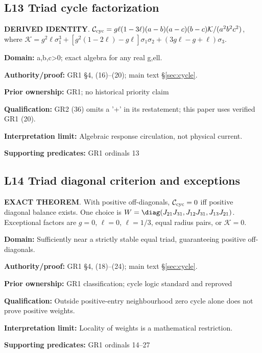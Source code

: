 \par\noindent\begin{minipage}{\linewidth}
\subsection*{L13 Triad cycle factorization}
\textbf{DERIVED IDENTITY}. \(\mathcal C_{\rm cyc}=g\ell(1-3\ell)(a-b)(a-c)(b-c)\mathcal K/(a^2b^2c^2)\), where \(\mathcal K=g^2\ell\sigma_1^3+[g^2(1-2\ell)-g\ell]\sigma_1\sigma_2+(3g\ell-g+\ell)\sigma_3\).\par
\textbf{Domain:} a,b,c>0; exact algebra for any real g,ell.\par
\textbf{Authority/proof:} GR1 \S{}4, (16)--(20); main text \S\ref{sec:cycle}.\par
\textbf{Prior ownership:} GR1; no historical priority claim\par
\textbf{Qualification:} GR2 (36) omits a '+' in its restatement; this paper uses verified GR1 (20).\par
\textbf{Interpretation limit:} Algebraic response circulation, not physical current.\par
\textbf{Supporting predicates:} GR1 ordinals 13\par
\end{minipage}\par\medskip
\par\noindent\begin{minipage}{\linewidth}
\subsection*{L14 Triad diagonal criterion and exceptions}
\textbf{EXACT THEOREM}. With positive off-diagonals, \(\mathcal C_{\rm cyc}=0\) iff positive diagonal balance exists. One choice is \(W=\diag(J_{21}J_{31},J_{12}J_{31},J_{13}J_{21})\). Exceptional factors are \(g=0\), \(\ell=0\), \(\ell=1/3\), equal radius pairs, or \(\mathcal K=0\).\par
\textbf{Domain:} Sufficiently near a strictly stable equal triad, guaranteeing positive off-diagonals.\par
\textbf{Authority/proof:} GR1 \S{}4, (18)--(24); main text \S\ref{sec:cycle}.\par
\textbf{Prior ownership:} GR1 classification; cycle logic standard and reproved\par
\textbf{Qualification:} Outside positive-entry neighbourhood zero cycle alone does not prove positive weights.\par
\textbf{Interpretation limit:} Locality of weights is a mathematical restriction.\par
\textbf{Supporting predicates:} GR1 ordinals 14--27\par
\end{minipage}\par\medskip
